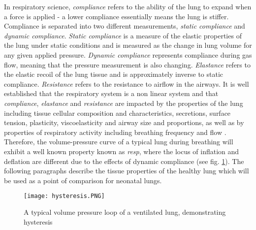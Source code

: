 \documentclass[12pt, openany, oneside]{book}
\begin{document}
\newpage

In respiratory science, \textit{compliance} refers to the ability of the lung to expand when a force is applied - a lower compliance essentially means the lung is stiffer. Compliance is separated into two different measurements, \textit{static compliance} and \textit{dynamic compliance}. \textit{Static compliance} is a measure of the elastic properties of the lung under static conditions and is measured as the change in lung volume for any given applied pressure. \textit{Dynamic compliance} represents compliance during gas flow, meaning that the pressure measurement is also changing. \textit{Elastance} refers to the elastic recoil of the lung tissue and is approximately inverse to static compliance. \textit{Resistance} refers to the resistance to airflow in the airways. It is well established that the respiratory system is a non linear system and that \textit{compliance}, \textit{elastance} and \textit{resistance} are impacted by the properties of the lung including tissue cellular composition and characteristics, secretions, surface tension, plasticity, viscoelasticity and airway size and proportions, as well as by properties of respiratory activity including breathing frequency and flow \citep{sivieri, respShade, measure}. Therefore, the volume-pressure curve of a typical lung during breathing will exhibit a well known property known as \textit{resp}, where the locus of inflation and deflation are different due to the effects of dynamic compliance (see fig. \ref{fig:hysteresis}). The following paragraphs describe the tissue properties of the healthy lung which will be used as a point of comparison for neonatal lungs.\\


\begin{figure}
	\centering		
	\texttt{[image: hysteresis.PNG]}	
	\caption[Lung hysteresis]{A typical volume pressure loop of a ventilated lung, demonstrating hysteresis \citep{sivieri} }
	\label{fig:hysteresis}
	
\end{figure}

\end{document}
